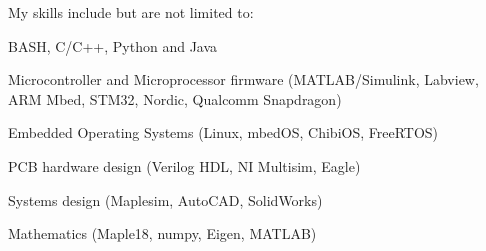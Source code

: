 
\begin{cvparagraph}

My skills include but are not limited to:
\newline
\begin{cvitems}
  \item BASH, C/C++, Python and Java
  \item Microcontroller and Microprocessor firmware (MATLAB/Simulink, Labview, ARM Mbed, STM32, Nordic, Qualcomm Snapdragon)
  \item Embedded Operating Systems (Linux, mbedOS, ChibiOS, FreeRTOS)
  \item PCB hardware design (Verilog HDL, NI Multisim, Eagle)
  \item Systems design (Maplesim, AutoCAD, SolidWorks)
  \item Mathematics (Maple18, numpy, Eigen, MATLAB)
\end{cvitems}
\end{cvparagraph}
